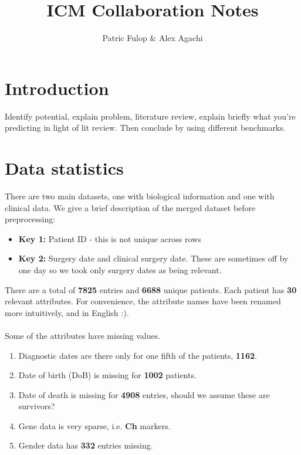 \documentclass[a4paper]{article}
\title{ICM Collaboration Notes}
\author{Patric Fulop \& Alex Agachi}
\affil{The University of Edinburgh}
\begin{document}
\maketitle


\section{Introduction}
Identify potential, explain problem, literature review, explain briefly what you're predicting in light of lit review. Then conclude by using different benchmarks. 
\section{Data statistics}
There are two main datasets, one with biological information and one with clinical data. 
We give a brief description of the merged dataset before preprocessing:
%
\begin{itemize}
\item \textbf{Key 1:} Patient ID - this is not unique across rows
\item \textbf{Key 2:} Surgery date and clinical surgery date. 
These are sometimes off by one day so we took only surgery dates as being relevant.
\end{itemize}
%
There are a total of \textbf{7825} entries and \textbf{6688} unique patients. Each patient has \textbf{30} relevant attributes. For convenience, the attribute names have been renamed more intuitively, and in English :). \\
\\
Some of the attributes have missing values.
\begin{enumerate}
\item Diagnostic dates are there only for one fifth of the patients,  \textbf{1162}.
\item Date of birth (DoB) is missing for \textbf{1002} patients.
\item Date of death is missing for \textbf{4908} entries, should we assume these are survivors? 
\item Gene data is very sparse, i.e. \textbf{Ch} markers.
\item Gender data has \textbf{332} entries missing.
\end{enumerate}


\end{document}
